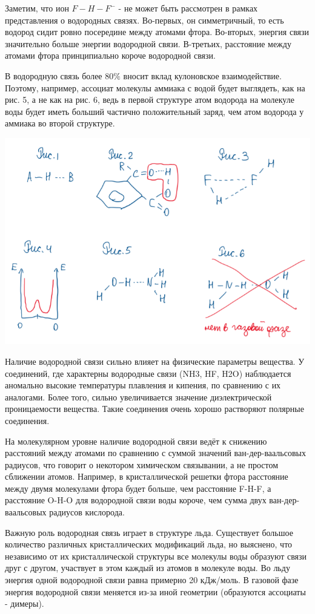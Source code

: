 \documentclass[14pt,a4paper]{scrartcl}
\begin{document}
Заметим, что ион $F-H-F^-$ - не может быть рассмотрен в рамках представления о водородных связях. Во-первых, он симметричный, то есть водород сидит ровно посередине между
атомами фтора. Во-вторых, энергия связи значительно больше энергии водородной связи. В-третьих, расстояние между атомами фтора принципиально короче водородной связи.

В водородную связь более $80\%$ вносит вклад кулоновское взаимодействие. Поэтому, например, ассоциат молекулы аммиака с водой будет выглядеть, как на рис. 5, а не как на рис. 6,
ведь в первой структуре атом водорода на молекуле воды будет иметь больший частично положительный заряд, чем атом водорода у аммиака во второй структуре.

\includegraphics{17v1.png}

Наличие водородной связи сильно влияет на физические параметры вещества. У соединений, где характерны водородные связи (NH3, HF, H2O) наблюдается аномально высокие
температуры плавления и кипения, по сравнению с их аналогами. Более того, сильно увеличивается значение диэлектрической проницаемости вещества. Такие соединения очень
хорошо растворяют полярные соединения.

На молекулярном уровне наличие водородной связи ведёт к снижению расстояний между атомами по сравнению с суммой значений ван-дер-ваальсовых радиусов, что говорит о
некотором химическом связывании, а не простом сближении атомов. Например, в кристаллической решетки фтора расстояние между двумя молекулами фтора будет больше, чем
расстояние F-H-F, а расстояние O-H-O для водородной связи воды короче, чем сумма двух ван-дер-ваальсовых радиусов кислорода.

Важную роль водородная связь играет в структуре льда. Существует большое количество различных кристаллических модификаций льда, но выяснено, что независимо от их
кристаллической структуры все молекулы воды образуют связи друг с другом, участвует в этом каждый из атомов в молекуле воды. Во льду энергия одной водородной связи равна
примерно 20 кДж/моль. В газовой фазе энергия водородной связи меняется из-за иной геометрии (образуются ассоциаты - димеры).
\end{document}
